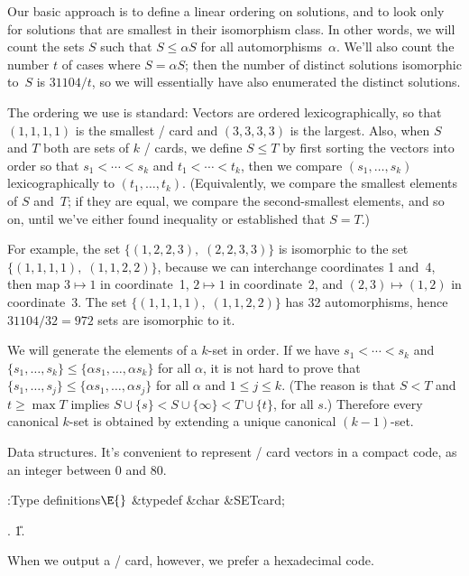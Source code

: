 Our basic approach is to define a linear ordering on
solutions, and to
look only for solutions that are smallest in their isomorphism class.
In other words, we will count the sets $S$ such that $S\le\alpha S$ for
all automorphisms~$\alpha$. We'll also count the number $t$ of cases where
$S=\alpha S$; then the number of distinct solutions isomorphic to~$S$
is $31104/t$, so we will essentially have also enumerated the distinct
solutions.

The ordering we use is standard: Vectors are ordered lexicographically,
so that $(1,1,1,1)$ is the smallest \SET/ card and $(3,3,3,3)$ is the largest.
Also, when $S$ and $T$ both are sets of $k$ \SET/ cards, we define
$S\le T$ by first sorting the vectors into order so that $s_1<\cdots<s_k$ and
$t_1<\cdots<t_k$, then we compare $(s_1,\ldots,s_k)$ lexicographically
to $(t_1,\ldots,t_k)$. (Equivalently, we compare the smallest elements
of $S$ and~$T$; if they are equal, we compare the second-smallest elements,
and so on, until we've either found inequality or established that $S=T$.)

For example, the set $\{(1,2,2,3),\;(2,2,3,3)\}$ is isomorphic to the
set $\{(1,1,1,1),\;(1,1,2,2)\}$, because we can interchange coordinates
1 and~4, then map $3\mapsto1$ in coordinate~1, $2\mapsto1$ in coordinate~2,
and $(2,3)\mapsto(1,2)$ in coordinate~3. The set $\{(1,1,1,1),\;(1,1,2,2)\}$
has 32 automorphisms, hence $31104/32=972$ sets are isomorphic to it.

We will generate the elements of a $k$-set in order. If we have
$s_1<\cdots<s_k$ and $\{s_1,\ldots,s_k\}\le\{\alpha s_1,\ldots,\alpha s_k\}$
for all $\alpha$, it is not hard to prove that $\{s_1,\ldots,s_j\}\le\{\alpha
s_1,\ldots,\alpha s_j\}$ for all $\alpha$ and $1\le j\le k$.
(The reason is that $S<T$ and $t\ge\max T$ implies
$S\cup\{s\}<S\cup\{\infty\}<T\cup\{t\}$, for all $s$.)
Therefore every canonical $k$-set is obtained by extending a unique
canonical $(k-1)$-set.

\fi

Data structures.
It's convenient to represent \SET/ card vectors in a compact code,
as an integer between 0 and 80.

\Y\B\4:Type definitions\X${}\E{}$\6
\&{typedef} \&{char} \&{SETcard};\par
{}.
\U1.\fi

When we output a \SET/ card, however, we prefer a hexadecimal
code.

